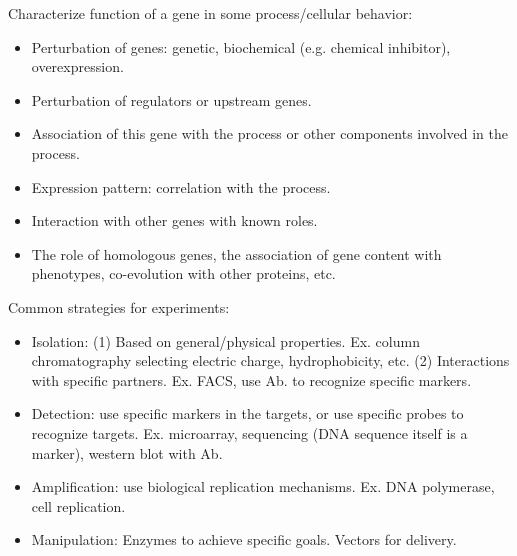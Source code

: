 \documentclass{report}
\begin{document}
Characterize function of a gene in some process/cellular behavior: 
\begin{itemize}
\item Perturbation of genes: genetic, biochemical (e.g. chemical inhibitor), overexpression.  
\item Perturbation of regulators or upstream genes.
\item Association of this gene with the process or other components involved in the process.  
\item Expression pattern: correlation with the process. 
\item Interaction with other genes with known roles.
\item The role of homologous genes, the association of gene content with phenotypes, co-evolution with other proteins, etc.  
\end{itemize}

Common strategies for experiments: 
\begin{itemize}
	\item Isolation: (1) Based on general/physical properties. Ex. column chromatography selecting electric charge, hydrophobicity, etc. (2) Interactions with specific partners. Ex. FACS, use Ab. to recognize specific markers.  
	
	\item Detection: use specific markers in the targets, or use specific probes to recognize targets. Ex. microarray, sequencing (DNA sequence itself is a marker), western blot with Ab. 
	
	\item Amplification: use biological replication mechanisms. Ex. DNA polymerase, cell replication. 
	
	\item Manipulation: Enzymes to achieve specific goals. Vectors for delivery. 
\end{itemize}
\end{document}
